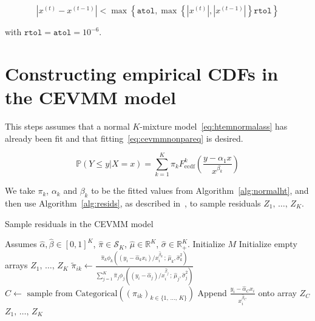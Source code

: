 \documentclass[11pt,twoside,openany]{book}
\newcommand{\code}[1]{\texttt{#1}}
\newcommand{\p}{\mathbb{P}}
\newcommand{\reals}{\mathbb{R}}
\numberwithin{Theorem}{chapter}
\numberwithin{Definition}{chapter}
\numberwithin{Lemma}{chapter}
\numberwithin{Algorithm}{chapter}
\numberwithin{equation}{chapter}
\begin{document}
\[
  \left|x^{(t)} - x^{(t-1)}\right| < \max\left\{\code{atol},\max\left\{\left|x^{(t)}\right|,\left|x^{(t-1)}\right|\right\} \code{rtol}\right\}
\]

with $\code{rtol}=\code{atol}=10^{-6}$.


\section{Constructing empirical CDFs in the CEVMM model}
\label{appendix:nonparametriccevmm}

This steps assumes that a normal $K$-mixture model~\eqref{eq:htemnormalass} has already been fit
and that fitting~\eqref{eq:cevmmnonpareq} is desired.


\begin{equation}\label{eq:cevmmnonpareq}
  \p\left(Y\leq y | X =x\right) = \sum_{k=1}^K
  \pi_k F^k_{\text{ecdf}}\left(\frac{y - \alpha_1 x}{x^{\beta_k}}\right)
\end{equation}

We take $\pi_k$, $\alpha_k$ and $\beta_k$ to be the fitted values from Algorithm~\ref{alg:normalht},
and then use Algorithm~\ref{alg:resids}, as described in~\cite{tendijck2021modeling}, to sample
residuals $Z_1,\,\ldots,\,Z_K$.

\begin{algorithm}
\caption{Sample residuals in the CEVMM model\label{alg:resids}}
\begin{algorithmic}
\State Assumes $\hat\alpha,\hat\beta\in[0,1]^K$, $\hat\pi\in\mathcal{S}_K$, $\hat\mu\in\reals^K$, $\hat\sigma\in\reals_{+}^K$.
\State Initialize $M$
\State Initialize empty arrays $Z_1,\,\ldots,\,Z_K$
    \State $\tilde\pi_{ik}  \gets \frac{\hat\pi_k \phi_k\left((y_i -  \hat\alpha_kx_i)/x_i^{\hat\beta_k}\,;\,\hat\mu_k,\hat\sigma^2_k\right)}{\sum_{j=1}^K\hat\pi_j
    \phi_j\left((y_i -  \hat\alpha_j)/x_i^{\hat\beta_j}\,;\,\hat\mu_j,\hat\sigma_j^2\right)}$
    \EndFor
  \EndFor
    \State $C \gets \text{ sample from Categorical}\left((\pi_{ik})_{k\in\{1,\,\ldots,\, K\}}\right)$
    \State Append $\frac{y_i - \hat\alpha_C x_i}{x_i^{\hat\beta_C}}$ onto array $Z_C$
    \EndFor
  \EndFor
\State \Return $Z_1,\,\ldots,\,Z_K$
\end{algorithmic}
\end{algorithm}
\end{document}
